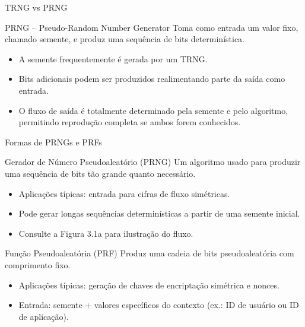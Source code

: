 \begin{frame}{TRNG vs PRNG}


    \begin{block}{PRNG – Pseudo-Random Number Generator}
        Toma como entrada um valor fixo, chamado semente, e produz uma sequência de bits determinística.
        \begin{itemize}
            \item A semente frequentemente é gerada por um TRNG.
            \item Bits adicionais podem ser produzidos realimentando parte da saída como entrada.
            \item O fluxo de saída é totalmente determinado pela semente e pelo algoritmo, permitindo reprodução completa se ambos forem conhecidos.
        \end{itemize}
    \end{block}
\end{frame}


\begin{frame}{Formas de PRNGs e PRFs}
    \begin{block}{Gerador de Número Pseudoaleatório (PRNG)}
        Um algoritmo usado para produzir uma sequência de bits tão grande quanto necessário.
        \begin{itemize}
            \item Aplicações típicas: entrada para cifras de fluxo simétricas.
            \item Pode gerar longas sequências determinísticas a partir de uma semente inicial.
            \item Consulte a Figura 3.1a para ilustração do fluxo.
        \end{itemize}
    \end{block}

    \begin{block}{Função Pseudoaleatória (PRF)}
        Produz uma cadeia de bits pseudoaleatória com comprimento fixo.
        \begin{itemize}
            \item Aplicações típicas: geração de chaves de encriptação simétrica e nonces.
            \item Entrada: semente + valores específicos do contexto (ex.: ID de usuário ou ID de aplicação).
        \end{itemize}
    \end{block}
\end{frame}

